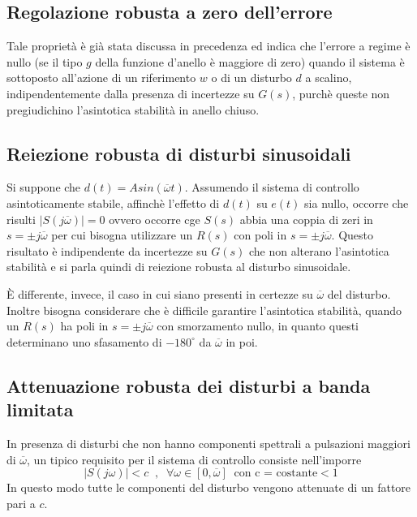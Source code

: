 \documentclass[a4paper]{report}
\begin{document}
\subsection{Regolazione robusta a zero dell'errore}
Tale propriet\`a \`e gi\`a stata discussa in precedenza ed indica che
l'errore a regime \`e nullo (se il tipo $g$ della funzione d'anello
\`e maggiore di zero) quando il sistema \`e sottoposto
all'azione di un riferimento $w$ o di un disturbo $d$ a scalino,
indipendentemente dalla presenza di incertezze su $G(s)$, purch\`e
queste non pregiudichino l'asintotica stabilit\`a in anello chiuso.
\subsection{Reiezione robusta di disturbi sinusoidali}
Si suppone che $d(t) = A sin(\overline{\omega}t)$. Assumendo il sistema
di controllo asintoticamente stabile, affinch\`e l'effetto di $d(t)$
su $e(t)$ sia nullo, occorre che risulti $|S(j \overline{\omega})| =
0$ ovvero occorre cge $S(s)$ abbia una coppia di zeri in $s = \pm j
\overline{\omega}$ per cui bisogna utilizzare un $R(s)$ con poli in $s
= \pm j \overline{\omega}$. Questo risultato \`e indipendente  da
incertezze su $G(s)$ che non alterano l'asintotica stabilit\`a e si
parla quindi di reiezione robusta al disturbo sinusoidale.

\`E differente, invece, il caso in cui siano presenti in certezze su
$\overline{\omega}$ del disturbo. Inoltre bisogna considerare che \`e
difficile garantire l'asintotica stabilit\`a, quando un $R(s)$ ha poli
in $s = \pm j \overline{\omega}$ con smorzamento nullo, in quanto
questi determinano uno sfasamento di $- 180^{\circ}$ da
$\overline{\omega}$ in poi.
\subsection{Attenuazione robusta dei disturbi a banda limitata}
In presenza di disturbi che non hanno componenti spettrali a
pulsazioni maggiori di $\overline{\omega}$, un tipico requisito per il
sistema di controllo consiste nell'imporre
\[
|S(j \omega)| < c \;\;,\;\; \forall \omega \in [0, \overline{\omega}]
\;\;\textrm{con c = costante} < 1
\]
In questo modo tutte le componenti del disturbo vengono attenuate di
un fattore pari a $c$.
\end{document}
